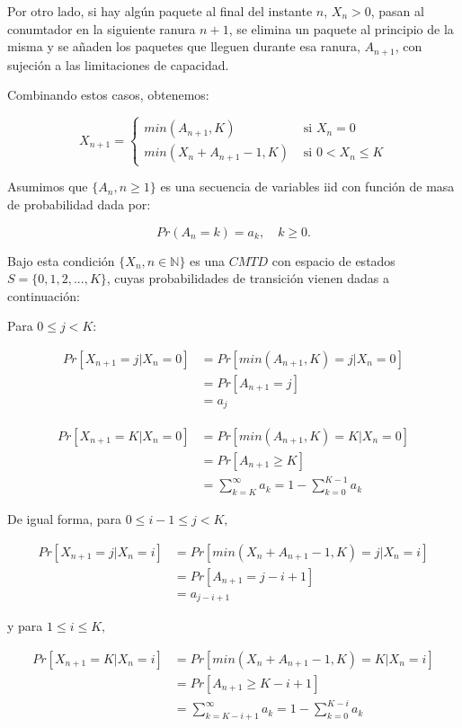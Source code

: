 \documentclass[
]{book}
\theoremstyle{definition}
\theoremstyle{definition}
\theoremstyle{definition}
\theoremstyle{definition}
\theoremstyle{remark}
\begin{document}
Por otro lado, si hay algún paquete al final del instante \(n\), \(X_n > 0\), pasan al conumtador en la siguiente ranura \(n+1\), se elimina un paquete al principio de la misma y se añaden los paquetes que lleguen durante esa ranura, \(A_{n+1}\), con sujeción a las limitaciones de capacidad.

Combinando estos casos, obtenemos:

\begin{equation*}
X_{n+1} =  
\begin{cases}
min(A_{n+1}, K) & \text{ si } X_n = 0\\
min(X_n + A_{n+1} - 1, K) & \text{ si } 0 < X_n \leq K
\end{cases}
\end{equation*}

Asumimos que \(\{A_n, n \geq 1\}\) es una secuencia de variables iid con función de masa de probabilidad dada por:

\[Pr(A_n = k) = a_k, \quad k \geq 0.\]

Bajo esta condición \(\{X_n, n \in \mathbb{N}\}\) es una \(CMTD\) con espacio de estados \(S = \{0, 1, 2,..., K\}\), cuyas probabilidades de transición vienen dadas a continuación:

Para \(0 \leq j < K\):

\[\begin{array}{ll}
Pr[X_{n+1} = j | X_n = 0] & = Pr[min(A_{n+1}, K) = j | X_n = 0]\\
& = Pr[A_{n+1} = j]\\
& = a_j
\end{array}\]

\[\begin{array}{ll}
Pr[X_{n+1} = K | X_n = 0] & = Pr[min(A_{n+1}, K) = K | X_n = 0]\\
& = Pr[A_{n+1} \geq K]\\
& =\sum_{k=K}^{\infty} a_k =1-\sum_{k=0}^{K-1} a_k
\end{array}\]

De igual forma, para \(0 \leq i -1 \leq j < K,\)

\[\begin{array}{ll}
Pr[X_{n+1} = j | X_n = i] & = Pr[min(X_n + A_{n+1} - 1, K) = j | X_n = i]\\
& = Pr[A_{n+1} = j - i + 1]\\
& = a_{j-i+1}
\end{array}\]

y para \(1 \leq i \leq K,\)

\[\begin{array}{ll}
Pr[X_{n+1} = K | X_n = i] & = Pr[min(X_n + A_{n+1} - 1, K) = K | X_n = i]\\
& = Pr[A_{n+1} \geq K - i + 1]\\
& = \sum_{k=K-i+1}^{\infty} a_k=1-\sum_{k=0}^{K-i} a_k
\end{array}\]
\end{document}
